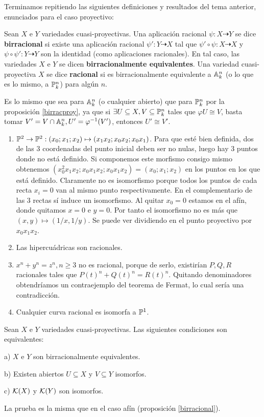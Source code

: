 \documentclass[ACGA.tex]{subfiles}
\begin{document}
Terminamos repitiendo las siguientes definiciones y resultados del tema anterior, enunciados para el caso proyectivo:

\begin{defi}
 Sean $X$ e $Y$ variedades cuasi-proyectivas. Una aplicación racional $\psi:X\dashrightarrow Y$ se dice {\bf birracional} si existe una aplicación racional $\psi':Y\dashrightarrow X$ tal que $\psi'\circ\psi:X\dashrightarrow X$ y $\psi\circ\psi':Y\dashrightarrow Y$ son la identidad (como aplicaciones racionales). En tal caso, las variedades $X$ e $Y$ se dicen {\bf birracionalmente equivalentes}. Una variedad cuasi-proyectiva $X$ se dice {\bf racional} si es birracionalmente equivalente a $\mathbb{A}^n_k$ (o lo que es lo mismo, a $\mathbb{P}^n_k$) para algún $n$.
\end{defi}
\begin{nota}
Es lo mismo que sea para $\mathbb{A}^n_k$ (o cualquier abierto) que para $\mathbb{P}^n_k$ por la proposición \ref{birracproy}, ya que si $\exists U\subseteq X, V\subseteq\mathbb{P}^n_k$ tales que $\varphi U\cong V$, basta tomar $V'=V\cap\mathbb{A}^n_k, U'=\varphi^{-1}(V')$, entonces $U'\cong V'$.
\end{nota}

\begin{ej}
\begin{enumerate}


\item $\mathbb{P}^2\to\mathbb{P}^2: (x_0;x_1;x_2)\mapsto (x_1x_2;x_0x_2;x_0x_1)$. Para que esté bien definida, dos de las 3 coordenadas del punto inicial deben ser no nulas, luego hay 3 puntos donde no está definido.  Si componemos este morfismo consigo mismo obtenemos $(x_0^2x_1x_2;x_0x_1x_2;x_0x_1x_2)=(x_0;x_1;x_2)$ en los puntos en los que está definido. Claramente no es isomorfismo porque todos los puntos de cada recta $x_i=0$ van al mismo punto respectivamente. En el complementario de las 3 rectas sí induce un isomorfismo. Al quitar $x_0=0$ estamos en el afín, donde quitamos $x=0$ e $y=0$. Por tanto el isomorfismo no es más que $(x,y)\mapsto(1/x,1/y)$. Se puede ver dividiendo en el punto proyectivo por $x_0x_1x_2$.
\item Las hipercuádricas son racionales.
\item $x^n+y^n=z^n, n\geq 3$ no es racional, porque de serlo, existirían $P,Q,R$ racionales tales que $P(t)^n+Q(t)^n=R(t)^n$. Quitando denominadores obtendríamos un contraejemplo del teorema de Fermat, lo cual sería una contradicción. 
\item Cualquier curva racional es isomorfa a $\mathbb{P}^1$. 
\end{enumerate}
\end{ej}

\begin{prop}\label{birracproy}
 Sean $X$ e $Y$ variedades cuasi-proyectivas. Las siguientes condiciones son equivalentes:

a) $X$ e $Y$ son birracionalmente equivalentes.

b) Existen abiertos $U\subseteq X$ y $V\subseteq Y$ isomorfos.

c) ${\mathcal K}(X)$ y ${\mathcal K}(Y)$ son isomorfos. 

\end{prop}

La prueba es la misma que en el caso afín (proposición \ref{birracional}).
\end{document}
